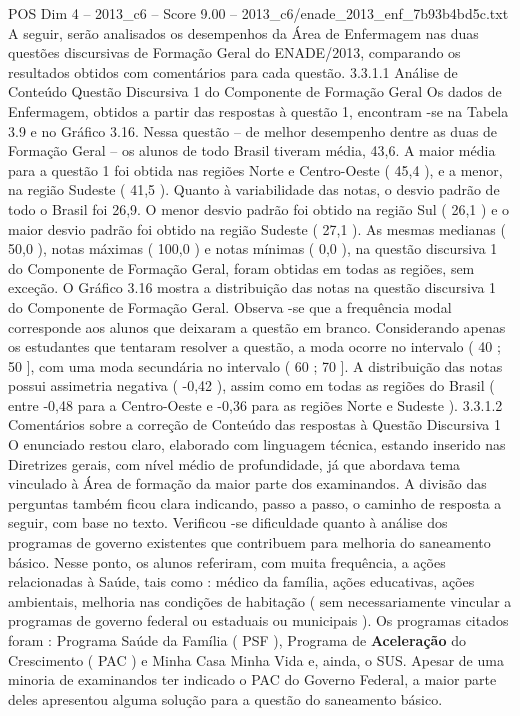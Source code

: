 \begin{textsample}{POS Dim 4 – 2013\_c6 – Score 9.00 – 2013\_c6/enade\_2013\_enf\_7b93b4bd5c.txt}
A seguir, serão analisados os desempenhos da Área de Enfermagem nas duas questões discursivas de Formação Geral do ENADE/2013, comparando os resultados obtidos com comentários para cada questão. 3.3.1.1 Análise de Conteúdo Questão Discursiva 1 do Componente de Formação Geral Os dados de Enfermagem, obtidos a partir das respostas à questão 1, encontram -se na Tabela 3.9 e no Gráfico 3.16.
Nessa questão – de melhor desempenho dentre as duas de Formação Geral – os alunos de todo Brasil tiveram média, 43,6.
A maior média para a questão 1 foi obtida nas regiões Norte e Centro-Oeste ( 45,4 ), e a menor, na região Sudeste ( 41,5 ).
Quanto à variabilidade das notas, o desvio padrão de todo o Brasil foi 26,9.
O menor desvio padrão foi obtido na região Sul ( 26,1 ) e o maior desvio padrão foi obtido na região Sudeste ( 27,1 ).
As mesmas medianas ( 50,0 ), notas máximas ( 100,0 ) e notas mínimas ( 0,0 ), na questão discursiva 1 do Componente de Formação Geral, foram obtidas em todas as regiões, sem exceção.
O Gráfico 3.16 mostra a distribuição das notas na questão discursiva 1 do Componente de Formação Geral.
Observa -se que a frequência modal corresponde aos alunos que deixaram a questão em branco.
Considerando apenas os estudantes que tentaram resolver a questão, a moda ocorre no intervalo ( 40 ; 50 ], com uma moda secundária no intervalo ( 60 ; 70 ].
A distribuição das notas possui assimetria negativa ( -0,42 ), assim como em todas as regiões do Brasil ( entre -0,48 para a Centro-Oeste e -0,36 para as regiões Norte e Sudeste ). 3.3.1.2 Comentários sobre a correção de Conteúdo das respostas à Questão Discursiva 1 O enunciado restou claro, elaborado com linguagem técnica, estando inserido nas Diretrizes gerais, com nível médio de profundidade, já que abordava tema vinculado à Área de formação da maior parte dos examinandos.
A divisão das perguntas também ficou clara indicando, passo a passo, o caminho de resposta a seguir, com base no texto.
Verificou -se dificuldade quanto à análise dos programas de governo existentes que contribuem para melhoria do saneamento básico.
Nesse ponto, os alunos referiram, com muita frequência, a ações relacionadas à Saúde, tais como : médico da família, ações educativas, ações ambientais, melhoria nas condições de habitação ( sem necessariamente vincular a programas de governo federal ou estaduais ou municipais ).
Os programas citados foram : Programa Saúde da Família ( PSF ), Programa de \textbf{Aceleração} do Crescimento ( PAC ) e Minha Casa Minha Vida e, ainda, o SUS.
Apesar de uma minoria de examinandos ter indicado o PAC do Governo Federal, a maior parte deles apresentou alguma solução para a questão do saneamento básico.

\end{textsample}
